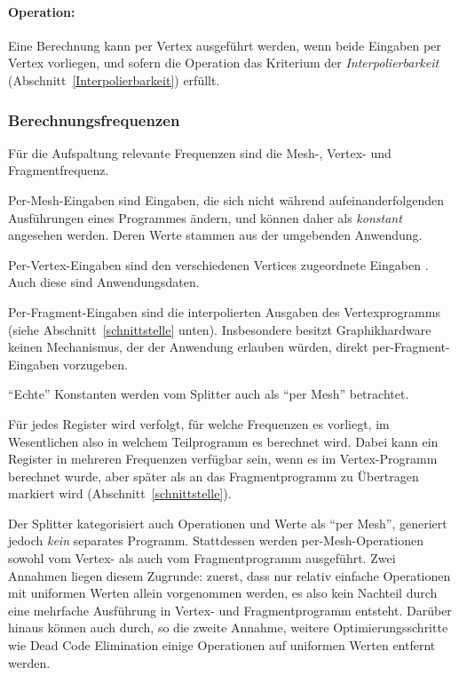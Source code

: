 \documentclass[twoside,a4paper,fleqn,12pt]{article}
\begin{document}
\paragraph{Operation:} Eine Berechnung kann per Vertex ausgeführt werden, wenn beide Eingaben per Vertex vorliegen, und
sofern die Operation das Kriterium der \emph{Interpolierbarkeit} (Abschnitt~\ref{Interpolierbarkeit}) erfüllt.

\subsubsection{Berechnungsfrequenzen}

Für die Aufspaltung relevante Frequenzen sind die Mesh-, %
Vertex- und Fragmentfrequenz.

Per-Mesh-Eingaben sind Eingaben, die sich nicht während aufeinanderfolgenden Ausführungen eines Programmes
ändern, und können daher als \emph{konstant} angesehen werden. Deren Werte stammen aus der umgebenden Anwendung.

Per-Vertex-Eingaben sind den verschiedenen Vertices zugeordnete Eingaben . %
Auch diese sind Anwendungsdaten.

Per-Fragment-Eingaben sind die interpolierten Ausgaben des Vertexprogramms (siehe Abschnitt~\ref{schnittstelle} unten). 
Insbesondere besitzt Graphikhardware keinen Mechanismus, der der Anwendung erlauben würden, direkt per-Fragment-Eingaben
vorzugeben.

"`Echte"' Konstanten werden vom Splitter auch als "`per Mesh"' betrachtet.

Für jedes Register wird verfolgt, für welche Frequenzen es vorliegt, im Wesentlichen also in welchem Teilprogramm es berechnet wird.
Dabei kann ein Register in mehreren Frequenzen verfügbar sein, wenn es im Vertex-Programm berechnet wurde, aber später als
an das Fragmentprogramm zu Übertragen markiert wird (Abschnitt~\ref{schnittstelle}).

Der Splitter kategorisiert auch Operationen und Werte als "`per Mesh"', generiert jedoch \emph{kein} separates Programm.
Stattdessen werden per-Mesh-Operationen sowohl vom Vertex- als auch vom Fragmentprogramm ausgeführt. Zwei Annahmen
liegen diesem Zugrunde: zuerst, dass nur relativ einfache Operationen mit uniformen Werten allein vorgenommen werden, es also kein
Nachteil durch eine mehrfache Ausführung in Vertex- und Fragmentprogramm entsteht. Darüber hinaus können auch durch, so die zweite Annahme,
weitere Optimierungsschritte wie Dead Code Elimination einige Operationen auf uniformen Werten entfernt werden.
\end{document}
